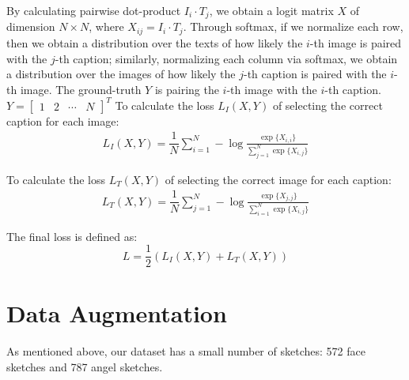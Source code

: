 By calculating pairwise dot-product $I_i \cdot T_j$, we obtain a logit matrix $X$ of dimension $N\times N$, where $X_{ij} = I_i \cdot T_j$. Through softmax, if we normalize each row, then we obtain a distribution over the texts of how likely the $i$-th image is paired with the $j$-th caption; similarly, normalizing each column via softmax, we obtain a distribution over the images of how likely the $j$-th caption is paired with the $i$-th image.   
The ground-truth $Y$ is pairing the $i$-th image with the $i$-th caption.  
$Y = \begin{bmatrix}1 & 2 & \cdots & N \end{bmatrix}^T $ 
To calculate the loss $L_I(X, Y)$ of selecting the correct caption for each image:
\begin{equation}
\begin{split}
    L_I(X, Y) = \dfrac{1}{N} \sum_{i=1}^N -\log\frac{\exp\{ {X}_{i,i} \}}{ \sum_{j=1}^N \exp\{ {X}_{i,j} \} }
\end{split}
\end{equation}

To calculate the loss $L_T(X, Y)$ of selecting the correct image for each caption:
\begin{equation}
\begin{split}
    L_T(X, Y) = \dfrac{1}{N} \sum_{j=1}^N -\log\frac{\exp\{ {X}_{j,j} \}}{ \sum_{i=1}^N \exp\{ {X}_{i,j} \} }
\end{split}
\end{equation}


The final loss is defined as:
$$L = \dfrac{1}{2} (L_I(X, Y) + L_T(X, Y))$$

\section{Data Augmentation}
As mentioned above, our dataset has a small number of sketches: 572 face sketches and 787 angel sketches.  



